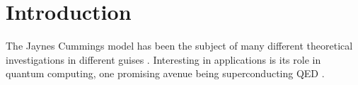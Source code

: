 \section{Introduction}
The Jaynes Cummings model has been the subject of many different theoretical investigations in different guises \cite{Abdalla2011} \cite{Benivegna1994}. Interesting in applications is its role in quantum computing, one promising avenue being superconducting QED \cite{Bishop2010}.

